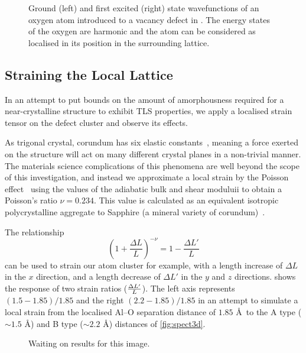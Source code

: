 \begin{figure}[htp]
\resizebox{0.5\textwidth}{!}{}
\caption[Oxygen Recovering Crystalline Position]{\label{fig:clustrecover}Ground (left) and first excited (right) state wavefunctions of an oxygen atom introduced to a vacancy defect in . The energy states of the oxygen are harmonic and the atom can be considered as localised in its position in the surrounding lattice.}
\end{figure}

\subsection{Straining the Local Lattice}

In an attempt to put bounds on the amount of amorphousness required for a near-crystalline structure to exhibit TLS properties, we apply a localised strain tensor on the defect cluster and observe its effects.

As trigonal crystal, corundum has six elastic constants~\cite{Bass1995}, meaning a force exerted on the structure will act on many different crystal planes in a non-trivial manner.
The materials science complications of this phenomena are well beyond the scope of this investigation, and instead we approximate a local strain by the Poisson effect~\cite{Poisson1829} using the values of the adiabatic bulk and shear moduluii to obtain a Poisson's ratio $\nu = 0.234$.
This value is calculated as an equivalent isotropic polycrystalline aggregate to Sapphire (a mineral variety of corundum)~\cite{Gercek2007}.

The relationship
\begin{equation}
\left(1+\frac{\Delta L}{L}\right)^{-\nu} = 1-\frac{\Delta L'}{L}
\label{eq:strain}
\end{equation}
can be used to strain our atom cluster for example, with a length increase of $\Delta L$ in the $x$ direction, and a length decrease of $\Delta L'$ in the $y$ and $z$ directions.
 shows the response of two strain ratios ($\cramped{\frac{\Delta L'}{L}}$).
The left axis represents $(1.5-1.85)/1.85$ and the right $(2.2-1.85)/1.85$ in an attempt to simulate a local strain from the localised Al--O separation distance of $1.85$ \AA\ to the A type ($\sim 1.5$ \AA) and B type ($\sim 2.2$ \AA) distances of \cref{fig:spect3d}.

\begin{figure}[htp]
\caption[Strain on a Crystalline Lattice]{\label{fig:cluststrain}Waiting on results for this image.}
\end{figure}

